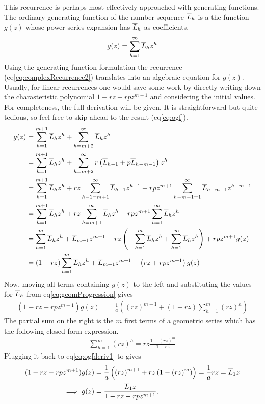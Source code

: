 This recurrence is perhaps most effectively approached with generating functions. The ordinary generating function of the number sequence $\overline{L}_h$ is a the function $g(z)$ whose power series expansion has $\overline{L}_h$ as coefficients.
\begin{align}
    g(z) = \sum_{h=1}^{\infty} \overline{L}_h z^h
\end{align}
Using the generating function formulation the recurrence (eq\ref{eq:complexRecurrence2}) translates into an algebraic equation for $g(z)$. Usually, for linear recurrences one would save some work by directly writing down the charasteristic polynomial $1 - rz - rpz^{m+1}$ and considering the initial values. For completeness, the full derivation will be given. It is straightforward but quite tedious, so feel free to skip ahead to the result (eq\ref{eq:ogf}).
\begin{align}
    g(z) &= \sum_{h=1}^{m+1} \overline{L}_h z^h + \sum_{h=m+2}^{\infty} \overline{L}_h z^h\nonumber\\
         &= \sum_{h=1}^{m+1} \overline{L}_h z^h + \sum_{h=m+2}^{\infty} r\left(\overline{L}_{h-1} + p\overline{L}_{h-m-1}\right)z^h\nonumber\\
         &= \sum_{h=1}^{m+1} \overline{L}_h z^h + rz\sum_{h-1=m+1}^{\infty}\overline{L}_{h-1}z^{h-1} + rpz^{m+1}\sum_{h-m-1=1}^{\infty}\overline{L}_{h-m-1}z^{h-m-1}\nonumber\\
         &= \sum_{h=1}^{m+1} \overline{L}_h z^h + rz\sum_{h=m+1}^{\infty}\overline{L}_{h}z^{h} + rpz^{m+1}\sum_{h=1}^{\infty}\overline{L}_{h}z^{h}\nonumber\\
         &= \sum_{h=1}^{m} \overline{L}_h z^h + \overline{L}_{m+1} z^{m+1} + rz\left(- \sum_{h=1}^{m}\overline{L}_{h}z^{h} + \sum_{h=1}^{\infty}\overline{L}_{h}z^{h}\right) + rpz^{m+1}g(z)\nonumber\\
         &= (1 - rz)\sum_{h=1}^{m} \overline{L}_h z^h + \overline{L}_{m+1} z^{m+1} + \left(rz + rpz^{m+1}\right)g(z)
\end{align}
Now, moving all terms containing $g(z)$ to the left and substituting the values for $\overline{L}_h$ from eq\ref{eq:geomProgression} gives
\begin{align}
    (1 - rz - rpz^{m+1})g(z) &= \frac{1}{a}\left({(rz)}^{m+1} + (1 - rz)\sum_{h=1}^{m} {(rz)}^h\right)\label{eq:ogfderiv1}
\end{align}
The partial sum on the right is the $m$ first terms of a geometric series which has the following closed form expression.
\begin{align*}
    \sum_{h=1}^{m} {(rz)}^h = rz\frac{1 - {(rz)}^m}{1-rz}
\end{align*}
Plugging it back to eq\ref{eq:ogfderiv1} to gives
\begin{align}
    (1 - rz - rpz^{m+1})g(z) &= \frac{1}{a}\left({(rz)}^{m+1} + rz\left(1 - {(rz)}^m\right)\right)\nonumber
                            = \frac{1}{a}rz\nonumber
                            = \overline{L}_1 z\nonumber\\
    \implies           g(z) &= \frac{\overline{L}_1 z}{1 - rz - rpz^{m+1}}\label{eq:ogf}.
\end{align}


